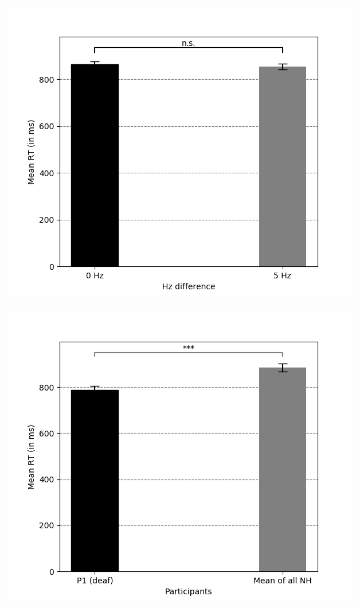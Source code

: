 \documentclass[12pt]{article}
\begin{document}
%
\begin{figure}[t!]
  \begin{subfigure}[h]{0.5\textwidth}
    \includegraphics[width=\textwidth]{0Hz_5Hz_bars.png}
    \caption{}
    \label{fig:1a}
  \end{subfigure}\quad
  \begin{subfigure}[h]{0.5\textwidth}
    \includegraphics[width=\textwidth]{0Hz_5Hz_deaf_vs_NH.png}
    \caption{}
    \label{fig:1b}
  \end{subfigure}\par

\end{figure}
\end{document}
